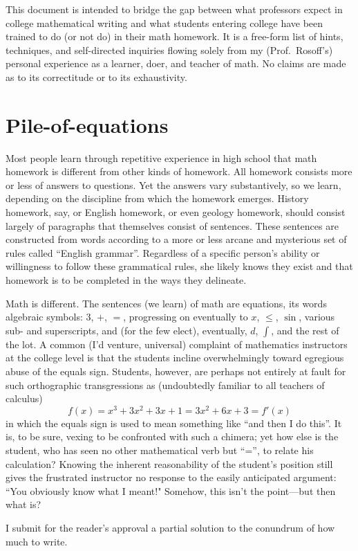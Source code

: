 

This document is intended to bridge the gap between what professors expect in college mathematical writing and what students entering college have been trained to do (or not do) in their math homework. It is a free-form list of hints, techniques, and self-directed inquiries flowing solely from my (Prof.\ Rosoff's) personal experience as a learner, doer, and teacher of math. No claims are made as to its correctitude or to its exhaustivity.

\section{Pile-of-equations}
Most people learn through repetitive experience in high school that math homework is different from other kinds of homework. All homework consists more or less of answers to questions. Yet the answers vary substantively, so we learn, depending on the discipline from which the homework emerges. History homework, say, or English homework, or even geology homework, should consist largely of paragraphs that themselves consist of sentences. These sentences are constructed from words according to a more or less arcane and mysterious set of rules called ``English grammar''. Regardless of a specific person's ability or willingness to follow these grammatical rules, she likely knows they exist and that homework is to be completed in the ways they delineate.

Math is different. The sentences (we learn) of math are equations, its words algebraic symbols: $3$, $+$, $=$, progressing on eventually to $x$, $\leq$, $\sin$, various sub- and superscripts, and (for the few elect), eventually, $d$, $\int$, and the rest of the lot. A common (I'd venture, universal) complaint of mathematics instructors at the college level is that the students incline overwhelmingly toward egregious abuse of the equals sign. Students, however, are perhaps not entirely at fault for such orthographic transgressions as (undoubtedly familiar to all teachers of calculus)
\[
f(x) = x^3 + 3x^2 + 3x + 1 = 3x^2 + 6x + 3 = f'(x)
\]
in which the equals sign is used to mean something like ``and then I do this''. It is, to be sure, vexing to be confronted with such a chimera; yet how else is the student, who has seen no other mathematical verb but ``='', to relate his calculation? Knowing the inherent reasonability of the student's position still gives the frustrated instructor no response to the easily anticipated argument: ``You obviously know what I meant!" Somehow, this isn't the point---but then what is?

I submit for the reader's approval a partial solution to the conundrum of how much to write.

